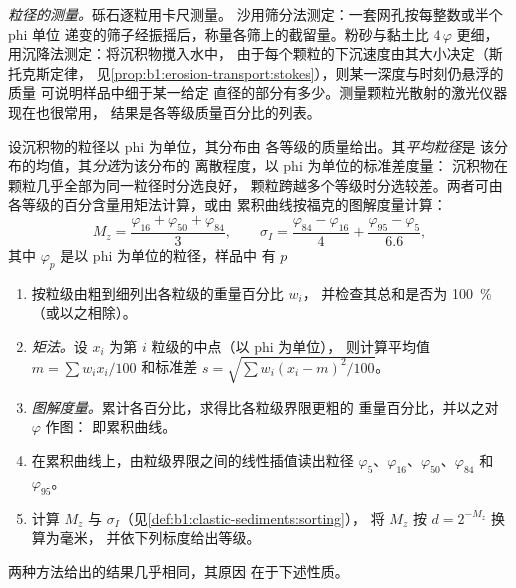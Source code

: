 \emph{粒径的测量。}砾石逐粒用卡尺测量。
沙用筛分法测定：一套网孔按每整数或半个 phi 单位
递变的筛子经振摇后，称量各筛上的截留量。粉砂与黏土比
$4\,\varphi$ 更细，用沉降法测定：将沉积物搅入水中，
由于每个颗粒的下沉速度由其大小决定（斯托克斯定律，
见\cref{prop:b1:erosion-transport:stokes}），则某一深度与时刻仍悬浮的质量
可说明样品中细于某一给定
直径的部分有多少。测量颗粒光散射的激光仪器现在也很常用，
结果是各等级质量百分比的列表。

\begin{definition}[平均粒径，分选]\label{def:b1:clastic-sediments:sorting}
设沉积物的粒径以 phi 为单位，其分布由
各等级的质量给出。其\emph{平均粒径}是
该分布的均值，其\emph{分选}为该分布的
离散程度，以 phi 为单位的标准差度量：
沉积物在颗粒几乎全部为同一粒径时分选良好，
颗粒跨越多个等级时分选较差。两者可由
各等级的百分含量用矩法计算，或由
累积曲线按福克的图解度量计算：
\[
  M_z = \frac{\varphi_{16} + \varphi_{50} + \varphi_{84}}{3}, \qquad
  \sigma_I = \frac{\varphi_{84} - \varphi_{16}}{4} + \frac{\varphi_{95} - \varphi_{5}}{6.6},
\]
其中 $\varphi_p$ 是以 phi 为单位的粒径，样品中
有 $p$%
\end{definition}

\begin{method}[由筛分分析求平均值与分选]\label{met:b1:clastic-sediments:graphic}
\begin{enumerate}
  \item 按粒级由粗到细列出各粒级的重量百分比 $w_i$，
        并检查其总和是否为 \qty{100}{\percent}（或以之相除）。
  \item \emph{矩法。}设 $x_i$ 为第 $i$ 粒级的中点（以 phi 为单位），
        则计算平均值 $m = \sum w_i x_i / 100$ 和标准差
        $s = \sqrt{\sum w_i (x_i - m)^2 / 100}$。
  \item \emph{图解度量。}累计各百分比，求得比各粒级界限更粗的
        重量百分比，并以之对 $\varphi$ 作图：
        即累积曲线。
  \item 在累积曲线上，由粒级界限之间的线性插值读出粒径
        $\varphi_5$、$\varphi_{16}$、$\varphi_{50}$、$\varphi_{84}$ 和
        $\varphi_{95}$。
  \item 计算 $M_z$ 与 $\sigma_I$（见\cref{def:b1:clastic-sediments:sorting}），
        将 $M_z$ 按 $d = 2^{-M_z}$ 换算为毫米，
        并依下列标度给出等级。
\end{enumerate}
\end{method}

两种方法给出的结果几乎相同，其原因
在于下述性质。


